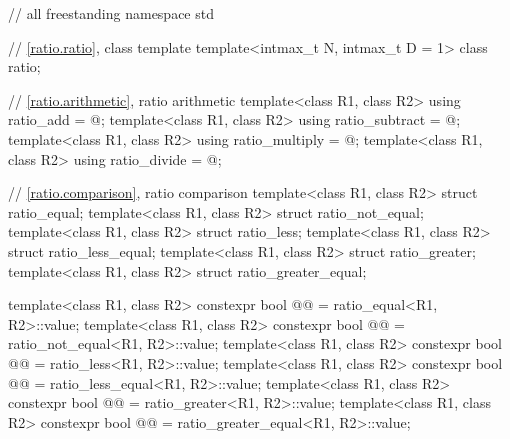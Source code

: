 %
\begin{codeblockdigitsep}
// all freestanding
namespace std {
  // \ref{ratio.ratio}, class template 
  template<intmax_t N, intmax_t D = 1> class ratio;

  // \ref{ratio.arithmetic}, ratio arithmetic
  template<class R1, class R2> using ratio_add = @\seebelow@;
  template<class R1, class R2> using ratio_subtract = @\seebelow@;
  template<class R1, class R2> using ratio_multiply = @\seebelow@;
  template<class R1, class R2> using ratio_divide = @\seebelow@;

  // \ref{ratio.comparison}, ratio comparison
  template<class R1, class R2> struct ratio_equal;
  template<class R1, class R2> struct ratio_not_equal;
  template<class R1, class R2> struct ratio_less;
  template<class R1, class R2> struct ratio_less_equal;
  template<class R1, class R2> struct ratio_greater;
  template<class R1, class R2> struct ratio_greater_equal;

  template<class R1, class R2>
    constexpr bool @@ = ratio_equal<R1, R2>::value;
  template<class R1, class R2>
    constexpr bool @@ = ratio_not_equal<R1, R2>::value;
  template<class R1, class R2>
    constexpr bool @@ = ratio_less<R1, R2>::value;
  template<class R1, class R2>
    constexpr bool @@ = ratio_less_equal<R1, R2>::value;
  template<class R1, class R2>
    constexpr bool @@ = ratio_greater<R1, R2>::value;
  template<class R1, class R2>
    constexpr bool @@ = ratio_greater_equal<R1, R2>::value;

}
\end{codeblockdigitsep}
